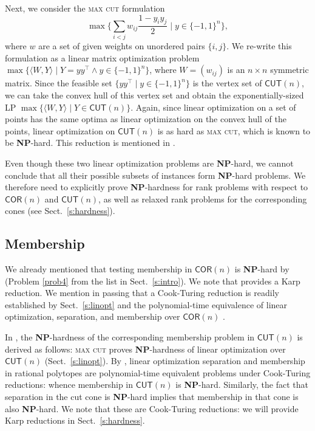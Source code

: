 \documentclass[envcountsect,envcountsame]{svjour3}
\theoremstyle{changebreak}                %
\newcommand{\transpose}[1]{{#1}^{\top}}
\newcommand{\COR}[1]{\mathsf{COR}(#1)}
\newcommand{\CUT}[1]{\mathsf{CUT}(#1)}
\begin{document}
Next, we consider the \textsc{max cut} formulation \cite{dezaLaurent}
\[\max\big\{\sum_{i<j} w_{ij}\frac{1-y_iy_j}{2} \;|\;y\in\{-1,1\}^n\big\},\]
where $w$ are a set of given weights on unordered pairs $\{i,j\}$. We re-write this formulation as a linear matrix optimization problem $\max\{\langle W,Y\rangle\;|\;Y=y\transpose{y}\land y\in\{-1,1\}^n\}$, where $W=(w_{ij})$ is an $n\times n$ symmetric matrix. Since the feasible set $\{y\transpose{y}\;|\;y\in\{-1,1\}^n\}$ is the vertex set of $\CUT{n}$, we can take the convex hull of this vertex set and obtain the exponentially-sized LP $\max\{\langle W,Y\rangle\;|\;Y\in\CUT{n}\}$. Again, since linear optimization on a set of points has the same optima as linear optimization on the convex hull of the points, linear optimization on $\CUT{n}$ is as hard as \textsc{max cut}, which is known to be \textbf{NP}-hard. This reduction is mentioned in \cite[Eq.~(4.1.4), p.~38]{dezaLaurent}. 

Even though these two linear optimization problems are \textbf{NP}-hard, we cannot conclude that all their possible subsets of instances form \textbf{NP}-hard problems. We therefore need to explicitly prove \textbf{NP}-hardness for rank problems with respect to $\COR{n}$ and $\CUT{n}$, as well as relaxed rank problems for the corresponding cones (see Sect.~\ref{s:hardness}).

\subsection{Membership}
\label{s:membership}
We already mentioned that testing membership in $\COR{n}$ is \textbf{NP}-hard by \cite{pitowsky} (Problem \ref{prob4} from the list in Sect.~\ref{s:intro}). We note that \cite{pitowsky} provides a Karp reduction. We mention in passing that a Cook-Turing reduction is readily established by Sect.~\ref{s:linopt} and the polynomial-time equivalence of linear optimization, separation, and membership over $\COR{n}$ \cite{gls}. 

In \cite{dezaLaurent}, the \textbf{NP}-hardness of the corresponding membership problem in $\CUT{n}$ is derived as follows: \textsc{max cut} proves \textbf{NP}-hardness of linear optimization over $\CUT{n}$ (Sect.~\ref{s:linopt}). By \cite{gls}, linear optimization separation and membership in rational polytopes are polynomial-time equivalent problems under Cook-Turing reductions: whence membership in $\CUT{n}$ is \textbf{NP}-hard. Similarly, the fact that separation in the cut cone is \textbf{NP}-hard \cite{karzanov} implies that membership in that cone is also \textbf{NP}-hard. We note that these are Cook-Turing reductions: we will provide Karp reductions in Sect.~\ref{s:hardness}.
\end{document}
